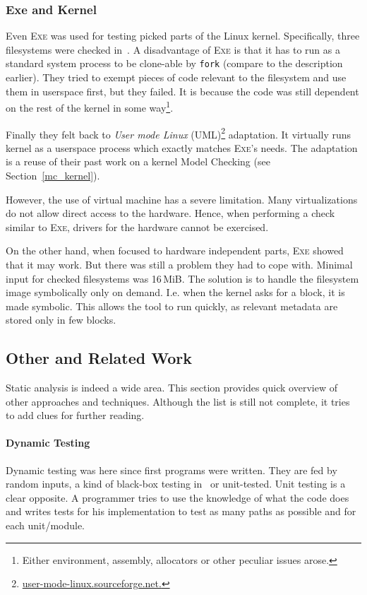 \documentclass[11pt,a4paper]{article}
\begin{document}
\subsubsection{Exe and Kernel}
\label{exe_kernel}
%
Even \textsc{Exe} was used for testing picked parts of the Linux kernel.
Specifically, three filesystems were checked in~\cite{exe_fs}. A disadvantage
of \textsc{Exe} is that it has to run as a standard system process to be
clone-able by \texttt{fork} (compare to the description earlier). They tried
to exempt pieces of code relevant to the filesystem and use them in userspace
first, but they failed. It is because the code was still dependent on the rest
of the kernel in some way\footnote{Either environment, assembly, allocators or
other peculiar issues arose.}.

Finally they felt back to \emph{User mode Linux}
(UML)\footnote{\url{user-mode-linux.sourceforge.net.}} adaptation. It
virtually runs kernel as a userspace process which exactly matches
\textsc{Exe}'s needs. The adaptation is a reuse of their past work on a kernel
Model Checking (see Section~\ref{mc_kernel}).

However, the use of virtual machine has a severe limitation. Many
virtualizations do not allow direct access to the hardware. Hence, when
performing a check similar to \textsc{Exe}, drivers for the hardware cannot be
exercised.

On the other hand, when focused to hardware independent parts, \textsc{Exe}
showed that it may work. But there was still a problem they had to cope with.
Minimal input for checked filesystems was 16\,MiB. The solution is to handle
the filesystem image symbolically only on demand. I.e. when the kernel asks
for a block, it is made symbolic. This allows the tool to run quickly, as
relevant metadata are stored only in few blocks.

\subsection{Other and Related Work}
Static analysis is indeed a wide area. This section provides quick overview
of other approaches and techniques. Although the list is still not complete,
it tries to add clues for further reading.

\paragraph{Dynamic Testing}
Dynamic testing was here since first programs were written. They are fed by
random inputs, a kind of black-box testing in~\cite{random1,random2,random3}
or unit-tested. Unit testing is a clear opposite. A programmer tries to use
the knowledge of what the code does and writes tests for his implementation to
test as many paths as possible and for each unit/module.
\end{document}
